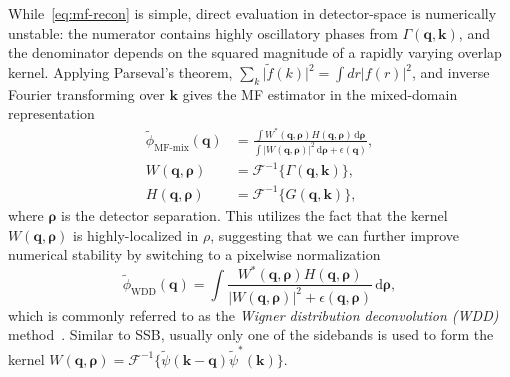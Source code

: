\documentclass[pdflatex,sn-aps,iicol]{sn-jnl}%
\begin{document}
While~\cref{eq:mf-recon} is simple, direct evaluation in detector-space is numerically unstable:
the numerator contains highly oscillatory phases from $\Gamma(\boldsymbol{q},\boldsymbol{k})$, and the denominator depends on the squared magnitude of a rapidly varying overlap kernel.
Applying Parseval's theorem, $\sum_k \lvert \tilde{f}(k)\rvert^2 = \int d r \lvert f(r)\rvert^2$, and inverse Fourier transforming over $\boldsymbol{k}$ gives the MF estimator in the mixed-domain representation
\begin{align}
\tilde{\phi}_{\text{MF-mix}}(\boldsymbol{q})
&=
\frac{\int W^{*}(\boldsymbol{q},\boldsymbol{\rho})H(\boldsymbol{q},\boldsymbol{\rho})\,\mathrm{d}\boldsymbol{\rho}}
{\int \lvert W(\boldsymbol{q},\boldsymbol{\rho}) \rvert^2\,\mathrm{d}\boldsymbol{\rho}+\epsilon(\boldsymbol{q})},
\label{eq:mf-mixed-recon}
\\
W(\boldsymbol{q},\boldsymbol{\rho})
&=
\mathcal{F}^{-1}\{\Gamma(\boldsymbol{q},\boldsymbol{k})\},
\label{eq:wigner-w}
\\
H(\boldsymbol{q},\boldsymbol{\rho})
&=
\mathcal{F}^{-1}\{G(\boldsymbol{q},\boldsymbol{k})\},
\label{eq:wigner-h}
\end{align}
where $\boldsymbol{\rho}$ is the detector separation.
This utilizes the fact that the kernel $W(\boldsymbol{q},\boldsymbol{\rho})$ is highly-localized in $\rho$, suggesting that we can further improve numerical stability by switching to a pixelwise normalization
\begin{equation}
\tilde{\phi}_{\text{WDD}}(\boldsymbol{q})=
\int \frac{ W^{*}(\boldsymbol{q},\boldsymbol{\rho})H(\boldsymbol{q},\boldsymbol{\rho})}
{\lvert W(\boldsymbol{q},\boldsymbol{\rho}) \rvert^2+\epsilon(\boldsymbol{q},\boldsymbol{\rho})}\,\mathrm{d}\boldsymbol{\rho},
\label{eq:wdd-recon}
\end{equation}
which is commonly referred to as the \emph{Wigner distribution deconvolution (WDD)} method~\cite{Rodenburg_1992,Li_2014,Yang_2017}.
Similar to SSB, usually only one of the sidebands is used to form the kernel $W(\boldsymbol{q},\boldsymbol{\rho}) = \mathcal{F}^{-1}\{\tilde{\psi}(\boldsymbol{k-q})\tilde{\psi}^{*}(\boldsymbol{k})\}$.
\end{document}
